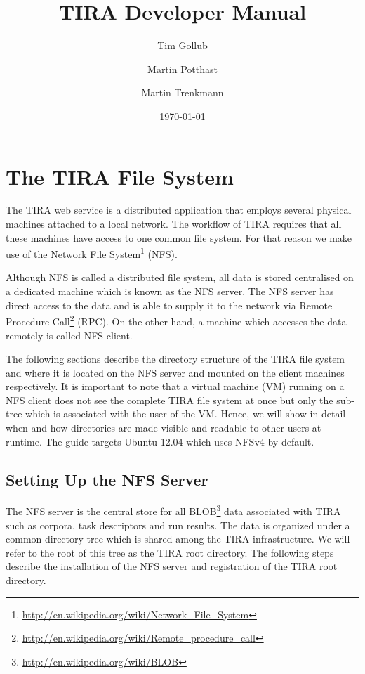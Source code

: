 \documentclass[12pt,a4paper,oneside,titlepage,draft]{report}
\newcommand{\tira}{TIRA\xspace}
\begin{document}
\title{TIRA Developer Manual}
\author{Tim Gollub \and Martin Potthast \and Martin Trenkmann}
\date{\today}
\maketitle
\tableofcontents

\chapter{The TIRA File System}
The \tira web service is a distributed application that employs several physical machines attached to a local network. The workflow of \tira requires that all these machines have access to one common file system. For that reason we make use of the Network File System\footnote{\url{http://en.wikipedia.org/wiki/Network_File_System}} (NFS).

Although NFS is called a distributed file system, all data is stored centralised on a dedicated machine which is known as the NFS server. The NFS server has direct access to the data and is able to supply it to the network via Remote Procedure Call\footnote{\url{http://en.wikipedia.org/wiki/Remote_procedure_call}} (RPC). On the other hand, a machine which accesses the data remotely is called NFS client.

The following sections describe the directory structure of the \tira file system and where it is located on the NFS server and mounted on the client machines respectively. It is important to note that a virtual machine (VM) running on a NFS client does not see the complete \tira file system at once but only the sub-tree which is associated with the user of the VM. Hence, we will show in detail when and how directories are made visible and readable to other users at runtime. The guide targets Ubuntu 12.04 which uses NFSv4 by default.

\section{Setting Up the NFS Server}
The NFS server is the central store for all BLOB\footnote{\url{http://en.wikipedia.org/wiki/BLOB}} data associated with \tira such as corpora, task descriptors and run results. The data is organized under a common directory tree which is shared among the \tira infrastructure. We will refer to the root of this tree as the \tira root directory. The following steps describe the installation of the NFS server and registration of the \tira root directory.
\end{document}
